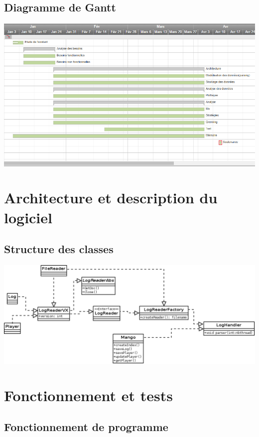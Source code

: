 \documentclass{scrreprt}
\begin{document}
\section{Diagramme de Gantt}

\includegraphics[scale=0.45,keepaspectratio]{gantt}\\

\chapter{Architecture et description du logiciel}

\section{Structure des classes}


\includegraphics[scale=0.45,keepaspectratio]{nouvelleArch}\\


\chapter{Fonctionnement et tests}
\section{Fonctionnement de programme}
\end{document}
